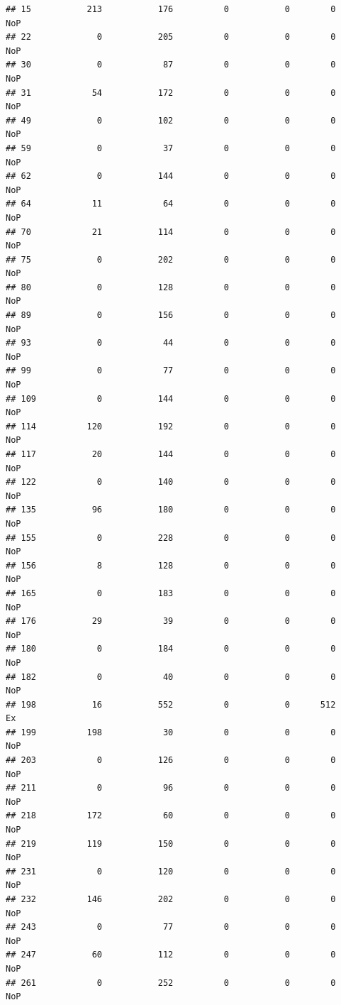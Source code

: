 \documentclass[]{article}
\begin{document}
\begin{verbatim}
## 15           213           176          0           0        0    NoP
## 22             0           205          0           0        0    NoP
## 30             0            87          0           0        0    NoP
## 31            54           172          0           0        0    NoP
## 49             0           102          0           0        0    NoP
## 59             0            37          0           0        0    NoP
## 62             0           144          0           0        0    NoP
## 64            11            64          0           0        0    NoP
## 70            21           114          0           0        0    NoP
## 75             0           202          0           0        0    NoP
## 80             0           128          0           0        0    NoP
## 89             0           156          0           0        0    NoP
## 93             0            44          0           0        0    NoP
## 99             0            77          0           0        0    NoP
## 109            0           144          0           0        0    NoP
## 114          120           192          0           0        0    NoP
## 117           20           144          0           0        0    NoP
## 122            0           140          0           0        0    NoP
## 135           96           180          0           0        0    NoP
## 155            0           228          0           0        0    NoP
## 156            8           128          0           0        0    NoP
## 165            0           183          0           0        0    NoP
## 176           29            39          0           0        0    NoP
## 180            0           184          0           0        0    NoP
## 182            0            40          0           0        0    NoP
## 198           16           552          0           0      512     Ex
## 199          198            30          0           0        0    NoP
## 203            0           126          0           0        0    NoP
## 211            0            96          0           0        0    NoP
## 218          172            60          0           0        0    NoP
## 219          119           150          0           0        0    NoP
## 231            0           120          0           0        0    NoP
## 232          146           202          0           0        0    NoP
## 243            0            77          0           0        0    NoP
## 247           60           112          0           0        0    NoP
## 261            0           252          0           0        0    NoP

\end{verbatim}
\end{document}
